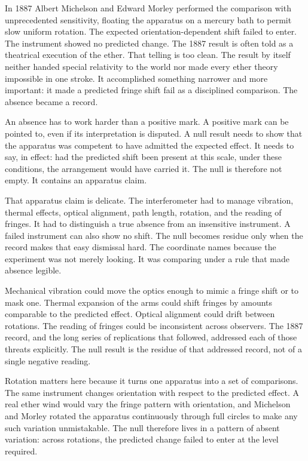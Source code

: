 In 1887 Albert Michelson and Edward Morley performed the comparison with
unprecedented sensitivity, floating the apparatus on a mercury bath to
permit slow uniform rotation. The expected orientation-dependent shift
failed to enter. The instrument showed no predicted change. The 1887
result is often told as a theatrical execution of the ether. That telling
is too clean. The result by itself neither handed special relativity to
the world nor made every ether theory impossible in one stroke. It
accomplished something narrower and more important: it made a predicted
fringe shift fail as a disciplined comparison. The absence became a record.

An absence has to work harder than a positive mark. A positive mark can be
pointed to, even if its interpretation is disputed. A null result needs to
show that the apparatus was competent to have admitted the expected
effect. It needs to say, in effect: had the predicted shift been present
at this scale, under these conditions, the arrangement would have carried
it. The null is therefore not empty. It contains an apparatus claim.

That apparatus claim is delicate. The interferometer had to manage
vibration, thermal effects, optical alignment, path length, rotation, and
the reading of fringes. It had to distinguish a true absence from an
insensitive instrument. A failed instrument can also show no shift. The
null becomes residue only when the record makes that easy dismissal hard.
The coordinate names  because the experiment was not
merely looking. It was comparing under a rule that made absence legible.

Mechanical vibration could move the optics enough to mimic a fringe shift
or to mask one. Thermal expansion of the arms could shift fringes by
amounts comparable to the predicted effect. Optical alignment could drift
between rotations. The reading of fringes could be inconsistent across
observers. The 1887 record, and the long series of replications that
followed, addressed each of those threats explicitly. The null result is
the residue of that addressed record, not of a single negative reading.

Rotation matters here because it turns one apparatus into a set of
comparisons. The same instrument changes orientation with respect to the
predicted effect. A real ether wind would vary the fringe pattern with
orientation, and Michelson and Morley rotated the apparatus continuously
through full circles to make any such variation unmistakable. The null
therefore lives in a pattern of absent variation: across rotations, the
predicted change failed to enter at the level required.

